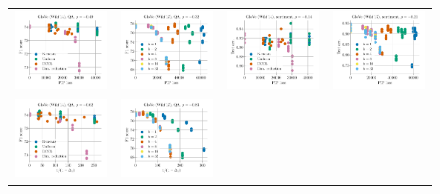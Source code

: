 \begin{figure}
\centering
	\begin{tabular}{c c c c}
		\includegraphics[width=0.23\linewidth]{figures/glove400k_qa_best-f1_vs_gram-large-dim-frob-error_linx.pdf} &
		\includegraphics[width=0.23\linewidth]{figures/glove-wiki400k-am_qa_best-f1_vs_gram-large-dim-frob-error_linx.pdf} &
		\includegraphics[width=0.23\linewidth]{figures/glove400k_sentiment_trec_test-acc_vs_gram-large-dim-frob-error_linx.pdf} &
		\includegraphics[width=0.23\linewidth]{figures/glove-wiki400k-am_sentiment_trec_test-acc_vs_gram-large-dim-frob-error_linx.pdf} \\
		\includegraphics[width=0.23\linewidth]{figures/glove400k_qa_best-f1_vs_gram-large-dim-delta1-2-trans_linx.pdf} &
		\includegraphics[width=0.23\linewidth]{figures/glove-wiki400k-am_qa_best-f1_vs_gram-large-dim-delta1-2-trans_linx.pdf} &

\end{tabular}
\end{figure}
